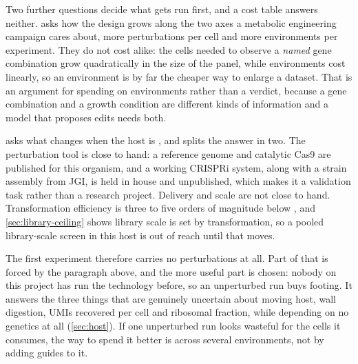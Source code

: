 Two further questions decide what gets run first, and a cost table answers
neither.  asks how the design grows along the two axes a
metabolic engineering campaign cares about, more perturbations per cell and more
environments per experiment. They do not cost alike: the cells needed to observe
a \emph{named} gene combination grow quadratically in the size of the panel,
while environments cost linearly, so an environment is by far the cheaper way to
enlarge a dataset. That is an argument for spending on environments rather than a
verdict, because a gene combination and a growth condition are different kinds of
information and a model that proposes edits needs both.

 asks what changes when the host is , and
splits the answer in two. The perturbation tool is close to hand: a reference
genome and catalytic Cas9 are published for this organism, and a working CRISPRi
system, along with a strain assembly from JGI, is held in house and
unpublished, which makes it a validation task
rather than a research project. Delivery and scale are not close to hand.
Transformation efficiency is three to five orders of magnitude below
, and \cref{sec:library-ceiling} shows library scale is set by
transformation, so a pooled library-scale screen in this host is out of reach
until that moves.

The first experiment therefore carries no perturbations at all. Part of that is
forced by the paragraph above, and the more useful part is chosen: nobody on this
project has run the technology before, so an unperturbed run buys footing. It
answers the three things that are genuinely uncertain about moving host, wall
digestion, UMIs recovered per cell and ribosomal fraction, while depending on no
genetics at all (\cref{sec:host}). If one unperturbed run looks wasteful for the
cells it consumes, the way to spend it better is across several environments, not
by adding guides to it.
